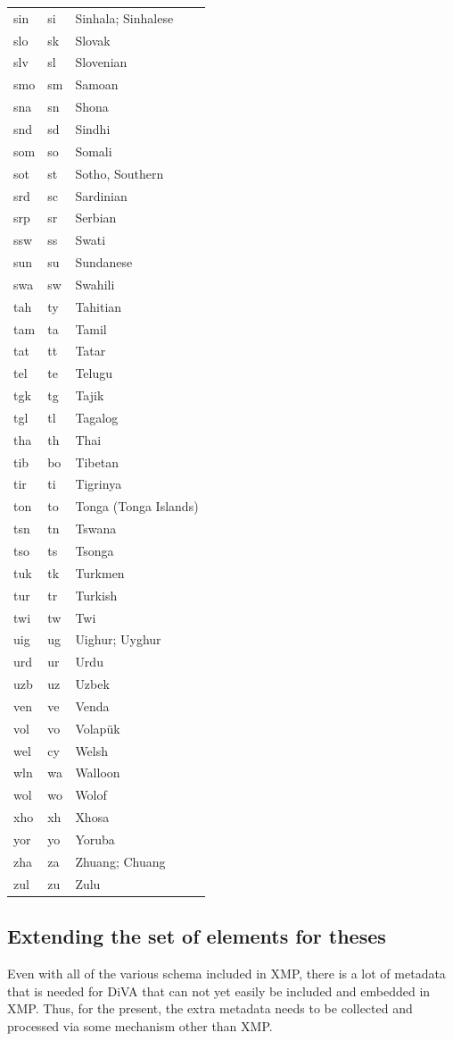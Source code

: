 \begin{longtable}{|L{3cm}|L{3cm}|L{5cm}|}
sin & si & Sinhala; Sinhalese\\
slo & sk & Slovak\\
slv & sl & Slovenian\\
smo & sm & Samoan\\
sna & sn & Shona\\
snd & sd & Sindhi\\
som & so & Somali\\
sot & st & Sotho, Southern\\
srd & sc & Sardinian\\
srp & sr & Serbian\\
ssw & ss & Swati\\
sun & su & Sundanese\\
swa & sw & Swahili\\
tah & ty & Tahitian\\
tam & ta & Tamil\\
tat & tt & Tatar\\
tel & te & Telugu\\
tgk & tg & Tajik\\
tgl & tl & Tagalog\\
tha & th & Thai\\
tib & bo & Tibetan\\
tir & ti & Tigrinya\\
ton & to & Tonga (Tonga Islands)\\
tsn & tn & Tswana\\
tso & ts & Tsonga\\
tuk & tk & Turkmen\\
tur & tr & Turkish\\
twi & tw & Twi\\
uig & ug & Uighur; Uyghur\\
urd & ur & Urdu\\
uzb & uz & Uzbek\\
ven & ve & Venda\\
vol & vo & Volapük\\
wel & cy & Welsh\\
wln & wa & Walloon\\
wol & wo & Wolof\\
xho & xh & Xhosa\\
yor & yo & Yoruba\\
zha & za & Zhuang; Chuang\\
zul & zu & Zulu\\
\end{longtable}
\FloatBarrier
%

\subsection{Extending the set of elements for theses}
\label{sec:newMetadataForTheses}
Even with all of the various schema included in XMP, there is a lot of metadata that is needed for DiVA that can not yet easily be included and embedded in XMP. Thus, for the present, the extra metadata needs to be collected and processed via some mechanism other than XMP.

